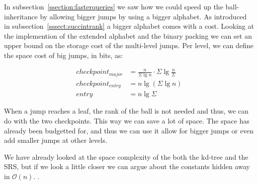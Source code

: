 In subsection~\ref{ssection:fasterqueries} we saw how we could speed up the ball-inheritance by allowing bigger jumps by using a bigger alphabet. As introduced in subsection~\ref{sssect:succintrank} a bigger alphabet comes with a cost. Looking at the implemention of the extended alphabet and the binary packing we can set an upper bound on the storage cost of the multi-level jumps. Per level, we can define the space cost of big jumps, in bits, as:

\begin{align*}
  checkpoint_{major} &= \frac{n}{\Sigma \lg n} \cdot \Sigma \lg \frac{n}{\Sigma} \\
  checkpoint_{entry} &= n \lg (\Sigma \lg n) \\
  entry &= n \lg \Sigma
\end{align*}

When a jump reaches a leaf, the rank of the ball is not needed and thus, we can do with the two checkpoints. This way we can save a lot of space. The space has already been budgetted for, and thus we can use it allow for bigger jumps or even add smaller jumps at other levels.

We have already looked at the space complexity of the both the kd-tree and the SRS, but if we look a little closer we can argue about the constants hidden away in $\mathcal{O}(n)$. .




